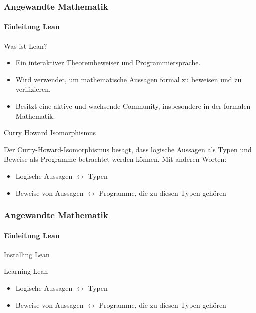 \documentclass{beamer}
\begin{document}
\begin{frame}
    \frametitle{Angewandte Mathematik}
\framesubtitle{Einleitung Lean}
    \begin{block}{Was ist Lean?}
        \begin{itemize}
            \item Ein interaktiver Theorembeweiser und Programmiersprache.
            \item Wird verwendet, um mathematische Aussagen formal zu beweisen und zu verifizieren.
            \item Besitzt eine aktive und wachsende Community, insbesondere in der formalen Mathematik.
        \end{itemize}
    \end{block}

\begin{block}{Curry Howard Isomorphismus}
   
     Der Curry-Howard-Isomorphismus besagt, dass logische Aussagen als Typen und Beweise als Programme betrachtet werden können. Mit anderen Worten:
    \begin{itemize}
        \item Logische Aussagen $\leftrightarrow$ Typen
    
        \item Beweise von Aussagen $\leftrightarrow$  Programme, die zu diesen Typen gehören
    \end{itemize}
    \end{block}

 \end{frame}


 
 \begin{frame}
    \frametitle{Angewandte Mathematik}
\framesubtitle{Einleitung Lean}
    \begin{block}{Installing Lean}

    \end{block}

\begin{block}{Learning Lean}
    \begin{itemize}
        \item Logische Aussagen $\leftrightarrow$ Typen
    
        \item Beweise von Aussagen $\leftrightarrow$  Programme, die zu diesen Typen gehören
    \end{itemize}
    \end{block}

 \end{frame}
\end{document}
